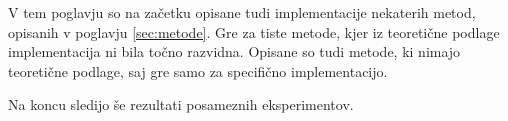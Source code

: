 V tem poglavju so na začetku opisane tudi implementacije nekaterih metod, opisanih v poglavju \ref{sec:metode}. Gre za tiste metode, kjer iz teoretične podlage implementacija ni bila točno razvidna. Opisane so tudi metode, ki nimajo teoretične podlage, saj gre samo za specifično implementacijo.

Na koncu sledijo še rezultati posameznih eksperimentov.

\renewcommand{\folder}{./pogl/03-eksperimenti}




